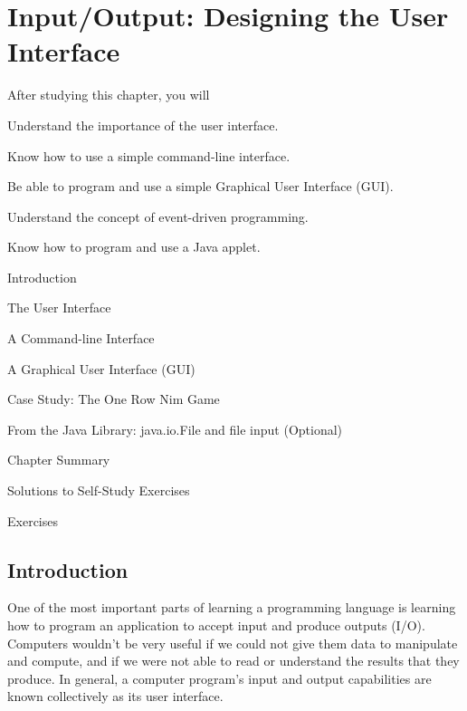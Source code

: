 
\setcounter{chapter}{3}
\setcounter{SSTUDYcount}{1}
\chapter{Input/Output: Designing the User Interface}
\label{chapter-io}
\label{pg-chapter-io}

\CObegin
{}
\noindent After studying this chapter, you will

\begin{COBL}
\item  Understand the importance of the user interface.
\item  Know how to use a simple command-line interface.
\item  Be able to program and use a simple Graphical User Interface (GUI).
\item  Understand the concept of event-driven programming.
\item  Know how to program and use a Java applet.
\end{COBL}

\begin{COL}
\item Introduction
\item The User Interface
\item A Command-line Interface
\item A Graphical User Interface (GUI)
\item Case Study: The One Row Nim Game
\item {From the Java Library: java.io.File and file input (Optional)}
\par\small\item[] Chapter Summary
\par\small\item[] Solutions to Self-Study Exercises
\par\small\item[] Exercises
\end{COL}
\COend

\section{Introduction}
\noindent One of the most important parts of learning a programming
language is learning how to program an application to accept input and
produce outputs (I/O). Computers wouldn't be very useful if we could
not give them data to manipulate and compute, and if we were not able
to read or understand the results that they produce. In general, a
computer program's input and output capabilities are known
collectively as its user interface.

